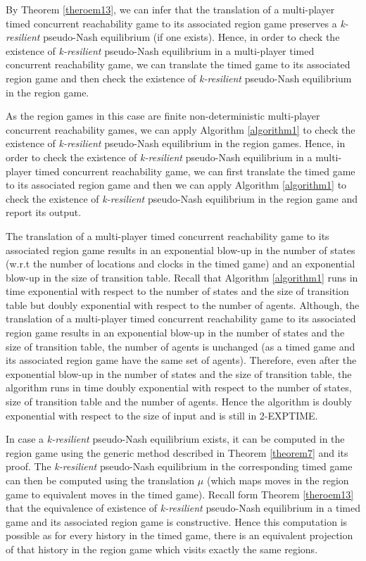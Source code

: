 By Theorem \ref{theroem13}, we can infer that the translation of a multi-player timed concurrent reachability game to its associated region game preserves a \textit{k-resilient} pseudo-Nash equilibrium (if one exists). Hence, in order to check the existence of \textit{k-resilient} pseudo-Nash equilibrium in a multi-player timed concurrent reachability game, we can translate the timed game to its associated region game and then check the existence of \textit{k-resilient} pseudo-Nash equilibrium in the region game. 

As the region games in this case are finite non-deterministic multi-player concurrent reachability games, we can apply Algorithm \ref{algorithm1} to check the existence of \textit{k-resilient} pseudo-Nash equilibrium in the region games. Hence, in order to check the existence of \textit{k-resilient} pseudo-Nash equilibrium in a multi-player timed concurrent reachability game, we can first translate the timed game to its associated region game and then we can apply Algorithm \ref{algorithm1} to check the existence of \textit{k-resilient} pseudo-Nash equilibrium in the region game and report its output.

The translation of a multi-player timed concurrent reachability game to its associated region game results in an exponential blow-up in the number of states (w.r.t the number of locations and clocks in the timed game) and an exponential blow-up in the size of transition table. Recall that Algorithm \ref{algorithm1} runs in time exponential with respect to the number of states and the size of transition table but doubly exponential with respect to the number of agents. Although, the translation of a multi-player timed concurrent reachability game to its associated region game results in an exponential blow-up in the number of states and the size of transition table, the number of agents is unchanged (as a timed game and its associated region game have the same set of agents). Therefore, even after the exponential blow-up in the number of states and the size of transition table, the algorithm runs in time doubly exponential with respect to the number of states, size of transition table and the number of agents. Hence the algorithm is doubly exponential with respect to the size of input and is still in 2-EXPTIME.

In case a \textit{k-resilient} pseudo-Nash equilibrium exists, it can be computed in the region game using the generic method described in Theorem \ref{theorem7} and its proof. The \textit{k-resilient} pseudo-Nash equilibrium in the corresponding timed game can then be computed using the translation $\mu$ (which maps moves in the region game to equivalent moves in the timed game). Recall form Theorem \ref{theroem13} that the equivalence of existence of \textit{k-resilient} pseudo-Nash equilibrium in a timed game and its associated region game is constructive. Hence this computation is possible as for every history in the timed game, there is an equivalent projection of that history in the region game which visits exactly the same regions.